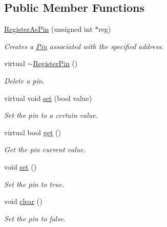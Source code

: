 \subsection*{Public Member Functions}
\begin{CompactItemize}
\item 
\hyperlink{classmprace_1_1RegisterAsPin_a0}{Register\-As\-Pin} (unsigned int $\ast$reg)
\begin{CompactList}\small\item\em Creates a \hyperlink{classmprace_1_1Pin}{Pin} associated with the specified address. \item\end{CompactList}\item 
virtual \hyperlink{classmprace_1_1RegisterAsPin_a1}{$\sim$Register\-Pin} ()
\begin{CompactList}\small\item\em Delete a pin. \item\end{CompactList}\item 
virtual void \hyperlink{classmprace_1_1RegisterAsPin_a2}{set} (bool value)
\begin{CompactList}\small\item\em Set the pin to a certain value. \item\end{CompactList}\item 
virtual bool \hyperlink{classmprace_1_1RegisterAsPin_a3}{get} ()
\begin{CompactList}\small\item\em Get the pin current value. \item\end{CompactList}\item 
void \hyperlink{classmprace_1_1RegisterAsPin_a4}{set} ()
\begin{CompactList}\small\item\em Set the pin to true. \item\end{CompactList}\item 
void \hyperlink{classmprace_1_1RegisterAsPin_a5}{clear} ()
\begin{CompactList}\small\item\em Set the pin to false. \item\end{CompactList}\end{CompactItemize}
